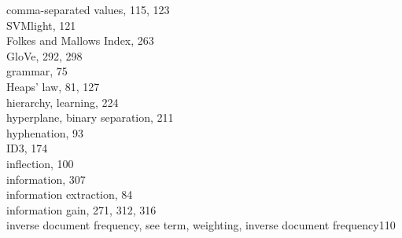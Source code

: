 \documentclass[10pt]{book}
\begin{document}
comma-separated values, 115, 123\\
SVMlight, 121\\
Folkes and Mallows Index, 263\\
GloVe, 292, 298\\
grammar, 75\\
Heaps' law, 81, 127\\
hierarchy, learning, 224\\
hyperplane, binary separation, 211\\
hyphenation, 93\\
ID3, 174\\
inflection, 100\\
information, 307\\
information extraction, 84\\
information gain, 271, 312, 316\\
inverse document frequency, see term, weighting, inverse document frequency110
\end{document}
